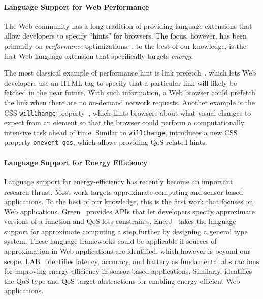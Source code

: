 \paragraph{Language Support for Web Performance} The Web community has a long tradition of providing language extensions that allow developers to specify ``hints'' for browsers. The focus, however, has been primarily on \textit{performance} optimizations. \greenweb, to the best of our knowledge, is the first Web language extension that specifically targets \textit{energy}.

The most classical example of performance hint is link prefetch~\cite{linkprefetch}, which lets Web developers use an HTML tag to specify that a particular link will likely be fetched in the near future. With such information, a Web browser could prefetch the link when there are no on-demand network requests. Another example is the CSS \texttt{willChange} property~\cite{csswillchange}, which hints browsers about what visual changes to expect from an element so that the browser could perform a computationally intensive task ahead of time. Similar to \texttt{willChange}, \greenweb introduces a new CSS property \texttt{onevent-qos}, which allows providing QoS-related hints.

\paragraph{Language Support for Energy Efficiency} Language support for energy-efficiency has recently become an important research thrust. Most work targets approximate computing and sensor-based applications. To the best of our knowledge, this is the first work that focuses on Web applications. Green~\cite{green} provides APIs that let developers specify approximate versions of a function and QoS loss constraints. EnerJ~\cite{enerJ} takes the language support for approximate computing a step further by designing a general type system. These language frameworks could be applicable if sources of approximation in Web applications are identified, which however is beyond our scope. LAB~\cite{lab} identifies latency, accuracy, and battery as fundamental abstractions for improving energy-efficiency in sensor-based applications. Similarly, \greenweb identifies the QoS type and QoS target abstractions for enabling energy-efficient Web applications.
